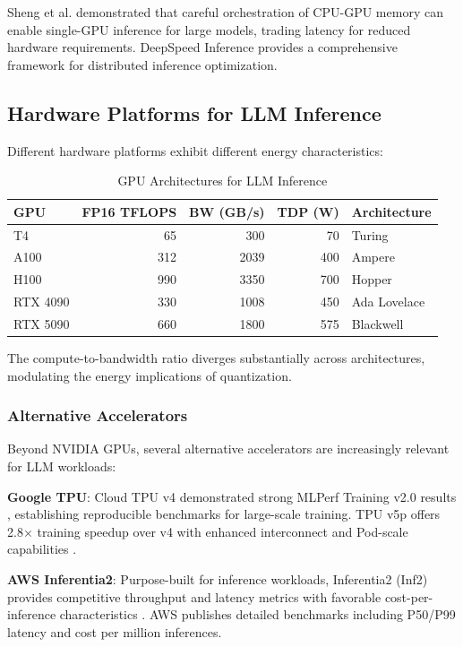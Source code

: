 \documentclass[11pt]{article}
\begin{document}
Sheng et al. \cite{sheng2023flexgen} demonstrated that careful orchestration of CPU-GPU memory can enable single-GPU inference for large models, trading latency for reduced hardware requirements. DeepSpeed Inference \cite{aminabadi2022deepspeed} provides a comprehensive framework for distributed inference optimization.

\subsection{Hardware Platforms for LLM Inference}

Different hardware platforms exhibit different energy characteristics:

\begin{table}[h]
\centering
\caption{GPU Architectures for LLM Inference}
\label{tab:gpu_arch}
\begin{tabular}{lrrrl}
\toprule
\textbf{GPU} & \textbf{FP16 TFLOPS} & \textbf{BW (GB/s)} & \textbf{TDP (W)} & \textbf{Architecture} \\
\midrule
T4 & 65 & 300 & 70 & Turing \\
A100 & 312 & 2039 & 400 & Ampere \\
H100 & 990 & 3350 & 700 & Hopper \\
RTX 4090 & 330 & 1008 & 450 & Ada Lovelace \\
RTX 5090 & 660 & 1800 & 575 & Blackwell \\
\bottomrule
\end{tabular}
\end{table}

The compute-to-bandwidth ratio diverges substantially across architectures, modulating the energy implications of quantization.

\subsubsection{Alternative Accelerators}

Beyond NVIDIA GPUs, several alternative accelerators are increasingly relevant for LLM workloads:

\textbf{Google TPU}: Cloud TPU v4 demonstrated strong MLPerf Training v2.0 results \cite{google2022tpuv4mlperf}, establishing reproducible benchmarks for large-scale training. TPU v5p offers 2.8$\times$ training speedup over v4 with enhanced interconnect and Pod-scale capabilities \cite{google2023tpuv5p, google2024tpuv5pspecs}.

\textbf{AWS Inferentia2}: Purpose-built for inference workloads, Inferentia2 (Inf2) provides competitive throughput and latency metrics with favorable cost-per-inference characteristics \cite{aws2025inferentia2}. AWS publishes detailed benchmarks including P50/P99 latency and cost per million inferences.
\end{document}
